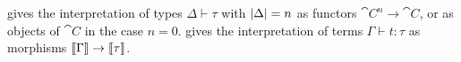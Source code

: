  gives the interpretation of types $\Delta \vdash \tau$ with $|\Delta|
= n$ as functors $\cat{C}^n \to \cat{C}$, or as objects of $\cat{C}$ in the case $n = 0$.
 gives the interpretation of terms $\Gamma \vdash t: \tau$ as morphisms
$\llbracket \Gamma \rrbracket \to \llbracket \tau \rrbracket$.

